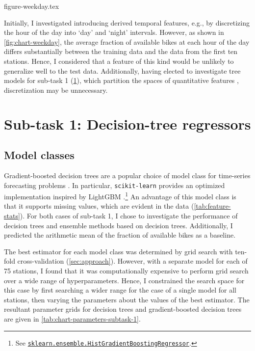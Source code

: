 \documentclass[11pt]{extarticle}
\newcommand{\sklearn}[2]{\href{https://scikit-learn.org/stable/modules/generated/sklearn.#1.#2.html}{\lstinline|sklearn.#1.#2|}}
\begin{document}
{figure-weekday.tex}

Initially, I investigated introducing derived temporal features, e.g., by discretizing
the hour of the day into `day' and `night' intervals.
However, as shown in \cref{fig:chart-weekday}, the average fraction of available bikes
at each hour of the day differs substantially between the training data and the data
from the first ten stations.
Hence, I considered that a feature of this kind would be unlikely to generalize well to
the test data.
Additionally, having elected to investigate tree models for sub-task 1
(\cref{sec:results-subtask-1}), which partition the spaces of quantitative features
\parencite[155]{Flach2012}, discretization may be unnecessary.

\section{Sub-task 1: Decision-tree regressors}
\label{sec:results-subtask-1}

\subsection{Model classes}

Gradient-boosted decision trees are a popular choice of model class for time-series
forecasting problems \parencite{Bojer2021}.
In particular, \texttt{scikit-learn} provides an optimized implementation inspired by
LightGBM \parencite{Ke2017}.\footnote{See
  \sklearn{ensemble}{HistGradientBoostingRegressor}.
}
An advantage of this model class is that it supports missing values, which are evident
in the data (\cref{tab:feature-stats}).
For both cases of sub-task 1, I chose to investigate the performance of decision trees
and ensemble methods based on decision trees.
Additionally, I predicted the arithmetic mean of the fraction of available bikes as a
baseline.

The best estimator for each model class was determined by grid search with ten-fold
cross-validation (\cref{sec:approach}).
However, with a separate model for each of 75 stations, I found that it was
computationally expensive to perform grid search over a wide range of hyperparameters.
Hence, I constrained the search space for this case by first searching a wider range
for the case of a single model for all stations, then varying the parameters about the
values of the best estimator.
The resultant parameter grids for decision trees and gradient-boosted decision trees
are given in \cref{tab:chart-parameters-subtask-1}.
\end{document}
